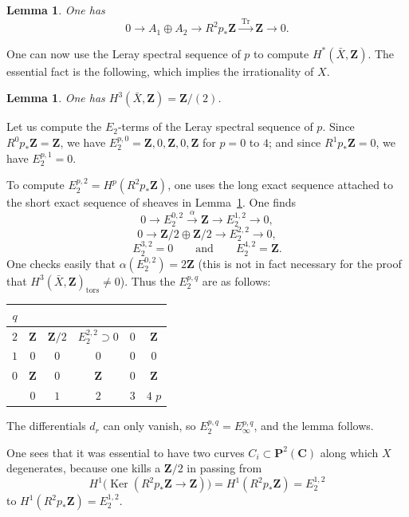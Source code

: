 \documentclass[12pt]{amsart}
\theoremstyle{plain}
\newtheorem{lemma}[theorem]{Lemma}
\theoremstyle{definition}
\theoremstyle{remark}
\DeclareMathOperator{\Tr}{Tr}
\DeclareMathOperator{\Ker}{Ker}
\begin{document}
\begin{lemma}\label{lem:3.5}
One has
\[
0\longrightarrow A_1\oplus A_2\longrightarrow R^2p_*\mathbf Z\xrightarrow{\;\Tr\;}\mathbf Z\longrightarrow 0.
\]
\end{lemma}

One can now use the Leray spectral sequence of $p$ to compute
$H^*(\bar X,\mathbf Z)$. The essential fact is the following, which implies the
irrationality of $X$.

\begin{lemma}\label{lem:3.6}
One has $H^3(\bar X,\mathbf Z)=\mathbf Z/(2)$.
\end{lemma}

Let us compute the $E_2$-terms of the Leray spectral sequence of $p$. Since
$R^0p_*\mathbf Z=\mathbf Z$, we have
$E_2^{p,0}=\mathbf Z,0,\mathbf Z,0,\mathbf Z$ for $p=0$ to $4$; and since
$R^1p_*\mathbf Z=0$, we have $E_2^{p,1}=0$.

To compute $E_2^{p,2}=H^p(R^2p_*\mathbf Z)$, one uses the long exact sequence
attached to the short exact sequence of sheaves in Lemma~\ref{lem:3.5}. One finds
\[
0\longrightarrow E_2^{0,2}\xrightarrow{\;\alpha\;}\mathbf Z\longrightarrow E_2^{1,2}\longrightarrow 0,
\]
\[
0\longrightarrow \mathbf Z/2\oplus \mathbf Z/2\longrightarrow E_2^{2,2}\longrightarrow 0,
\]
\[
E_2^{3,2}=0 \qquad\text{and}\qquad E_2^{4,2}=\mathbf Z.
\]
One checks easily that $\alpha(E_2^{0,2})=2\mathbf Z$ (this is not in fact necessary
for the proof that $H^3(\bar X,\mathbf Z)_{\mathrm{tors}}\neq 0$). Thus the
$E_2^{p,q}$ are as follows:

\begin{center}
\begin{tabular}{c|ccccc}
$q$ & & & & & \\ \hline
$2$ & $\mathbf{Z}$ & $\mathbf{Z}/2$ & $E_2^{2,2}\supset 0$ & $0$ & $\mathbf{Z}$ \\
$1$ & $0$ & $0$ & $0$ & $0$ & $0$ \\
$0$ & $\mathbf{Z}$ & $0$ & $\mathbf{Z}$ & $0$ & $\mathbf{Z}$ \\ \hline
& $0$ & $1$ & $2$ & $3$ & $4$ \quad $p$
\end{tabular}
\end{center}

The differentials $d_r$ can only vanish, so $E_2^{p,q}=E_\infty^{p,q}$, and the
lemma follows.

One sees that it was essential to have two curves $C_i\subset \mathbf P^2(\mathbf C)$
along which $X$ degenerates, because one kills a $\mathbf Z/2$ in passing from
\[
H^1\bigl(\Ker(R^2p_*\mathbf Z\to \mathbf Z)\bigr)=H^1(R^2p_*\mathbf Z)=E_2^{1,2}
\]
to $H^1(R^2p_*\mathbf Z)=E_2^{1,2}$.
\end{document}
